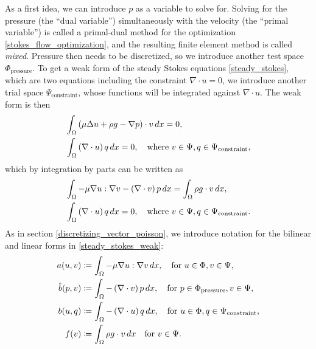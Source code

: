 \newcommand{\trialconstraint}{{\Psi_{\text{constraint}}}}
\newcommand{\testpressure}{{\Phi_{\text{pressure}}}}
As a first idea, we can introduce $p$ as a variable to solve for. Solving for the pressure (the ``dual variable'') simultaneously with the velocity
(the ``primal variable'')
is called a primal-dual method for the optimization \eqref{stokes_flow_optimization}, and the resulting finite element method is called \textit{mixed}.
Pressure then needs to be discretized, so we introduce another test space $\testpressure$.
To get a weak form of the steady Stokes equations \eqref{steady_stokes}, which are two equations including the constraint $\nabla\cdot u = 0$, we introduce
another trial space $\trialconstraint$, whose functions will be integrated against $\nabla\cdot u$. The weak form is then
\begin{equation*}
\begin{split}
    &\int_\om \left(\mu\Delta u + \rho g - \nabla p\right)\cdot v\,dx = 0,\\
    &\int_\om \left(\nabla\cdot u\right) q\,dx = 0, \quad\text{where $v \in \Psi, q \in \trialconstraint$},
\end{split}
\end{equation*}
which by integration by parts can be written as
\begin{equation}\label{steady_stokes_weak}
\begin{split}
    &\int_\om -\mu\nabla u : \nabla v - \left(\nabla\cdot v\right)p\,dx = \int_\om \rho g\cdot v\,dx,\\
    &\int_\om \left(\nabla\cdot u\right) q\,dx = 0, \quad\text{where $v \in \Psi, q \in \trialconstraint$}.
\end{split}
\end{equation}
As in section \ref{discretizing_vector_poisson}, we introduce notation for the bilinear and linear forms in \eqref{steady_stokes_weak}:
\begin{equation}
\begin{split}
    a(u, v) &\coloneqq \int_\om-\mu\nabla u : \nabla v\,dx,\quad\text{for $u \in \Phi, v \in \Psi$},\\
    \hat{b}(p, v) &\coloneqq \int_\om-\left(\nabla\cdot v\right)p\,dx,\quad\text{for $p \in \testpressure, v \in \Psi$},\\
    b(u, q) &\coloneqq \int_\om-\left(\nabla\cdot u\right)q\,dx,\quad\text{for $u \in \Phi, q \in \trialconstraint$},\\
    f(v) &\coloneqq \int_\om \rho g\cdot v\,dx\quad\text{for $v \in \Psi$}.
\end{split}
\end{equation}
